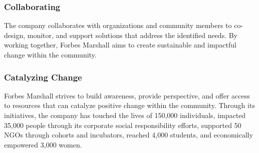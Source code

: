 \subsubsection{Collaborating}
The company collaborates with organizations and community members to co-design, monitor, and support solutions that address the identified needs. By working together, Forbes Marshall aims to create sustainable and impactful change within the community.

\subsubsection{Catalyzing Change}
Forbes Marshall strives to build awareness, provide perspective, and offer access to resources that can catalyze positive change within the community. Through its initiatives, the company has touched the lives of 150,000 individuals, impacted 35,000 people through its corporate social responsibility efforts, supported 50 NGOs through cohorts and incubators, reached 4,000 students, and economically empowered 3,000 women.

